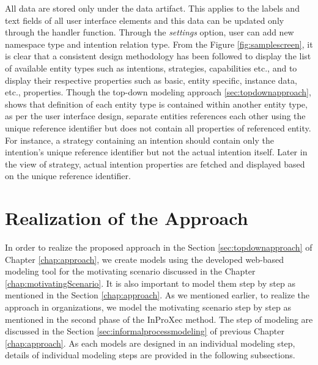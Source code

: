 All data are stored only under the data artifact. This applies to the labels and text fields of all user interface elements and this data can be updated only through the handler function. Through the \textit{settings} option, user can add new namespace type and intention relation type. From the Figure \ref{fig:samplescreen}, it is clear that a consistent design methodology has been followed to display the list of available entity types such as intentions, strategies, capabilities etc., and to display their respective properties such as basic, entity specific, instance data, etc., properties. Though the top-down modeling approach \ref{sec:topdownapproach}, shows that definition of each entity type is contained within another entity type, as per the user interface design, separate entities references each other using the unique reference identifier but does not contain all properties of referenced entity. For instance, a strategy containing an intention should contain only the intention's unique reference identifier but not the actual intention itself. Later in the view of strategy, actual intention properties are fetched and displayed based on the unique reference identifier. 


\section{Realization of the Approach}
\label{sec:realization}
In order to realize the proposed approach in the Section \ref{sec:topdownapproach} of Chapter \ref{chap:approach}, we create models using the developed web-based modeling tool for the motivating scenario discussed in the Chapter \ref{chap:motivatingScenario}. It is also important to model them step by step as mentioned in the Section \ref{chap:approach}. As we mentioned earlier, to realize the approach in organizations, we model the motivating scenario step by step as mentioned in the second phase of the InProXec method. The step of modeling are discussed in the Section \ref{sec:informalprocessmodeling} of previous Chapter \ref{chap:approach}. As each models are designed in an individual modeling step, details of individual modeling steps are provided in the following subsections. 

